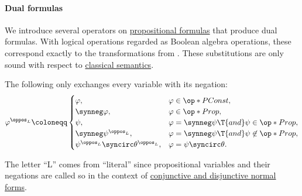 \paragraph{Dual formulas}

\begin{algorithm}\label{alg:dual_propositional_formulas}
  We introduce several operators on \hyperref[def:propositional_formula]{propositional formulas} that produce dual formulas. With logical operations regarded as Boolean algebra operations, these correspond exactly to the transformations from . These substitutions are only sound with respect to \hyperref[def:truth_value_algebra/intuitionistic]{classical semantics}.

  \begin{thmenum}
     The following only exchanges every variable with its negation:
    \begin{equation*}
      \varphi^{\oppos_L} \coloneqq \begin{cases}
        \varphi,                                    &\varphi \in \op*{PConst}, \\
        \synneg \varphi,                            &\varphi \in \op*{Prop}, \\
        \psi,                                       &\varphi = \synneg \psi \T{and} \psi \in \op*{Prop}, \\
        \synneg \psi^{\oppos_L},                    &\varphi = \synneg \psi \T{and} \psi \not\in \op*{Prop}, \\
        \psi^{\oppos_L} \syncirc \theta^{\oppos_L}, &\varphi = \psi \syncirc \theta. \\
      \end{cases}
    \end{equation*}

    The letter \enquote{L} comes from \enquote{literal} since propositional variables and their negations are called so in the context of \hyperref[def:cnf_and_dnf]{conjunctive and disjunctive normal forms}.


\end{thmenum}
\end{algorithm}
